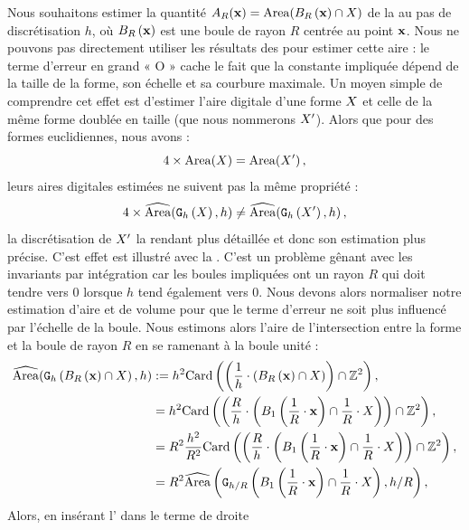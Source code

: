 Nous souhaitons estimer la quantité $A_R(\vx) = \Area(\Ball{R}{\vx}\cap\Shape)$ de la
 au pas de discrétisation $h$, où $\Ball{R}{\vx}$ est une
boule de rayon $R$ centrée au point $\vx$. Nous ne pouvons pas directement
utiliser les résultats des
 pour estimer cette
aire : le terme d'erreur en grand « O » cache le fait que la constante impliquée
dépend de la taille de la forme, son échelle et sa courbure maximale. Un moyen
simple de comprendre cet effet est d'estimer l'aire digitale d'une forme $\Shape$ et
celle de la même forme doublée en taille (que nous nommerons
$\Shape'$). Alors que pour des formes euclidiennes, nous avons :
%
\begin{equation}
  4 \times \Area(\Shape) = \Area(\Shape') \,,
\end{equation}
%
leurs aires digitales estimées ne suivent pas la même propriété :
%
\begin{equation}
  4 \times \AreaC(\DSh,h) \ne \AreaC(\DigF{\Shape'}{h},h) \,,
\end{equation}
%
la discrétisation de $\Shape'$ la rendant plus détaillée et donc son estimation
plus précise. C'est effet est illustré avec la . C'est
un problème gênant avec les invariants par intégration car les boules impliquées
ont un rayon $R$ qui doit tendre vers $0$ lorsque $h$ tend également vers $0$.
Nous devons alors normaliser notre estimation d'aire et de volume pour que le
terme d'erreur ne soit plus influencé par l'échelle de la boule. Nous estimons
alors l'aire de l'intersection entre la forme et la boule de rayon $R$ en se
ramenant à la boule unité :
%
\begin{align}
  \AreaC(\DigF{\Ball{R}{\vx} \cap \Shape}{h}, h) & \EqDef h^2 \MCard\left( \left( \frac{1}{h} \cdot \left( \Ball{R}{\vx} \cap \Shape \right) \right) \cap \Z^2 \right), \\
   & = h^2 \MCard\left( \left(\frac{R}{h} \cdot \left( \Ball{1}{\frac{1}{R} \cdot \vx} \cap \frac{1}{R} \cdot \Shape\right) \right) \cap \Z^2 \right), \\
   & = R^2 \frac{h^2}{R^2} \MCard\left( \left(\frac{R}{h} \cdot \left( \Ball{1}{\frac{1}{R} \cdot \vx} \cap \frac{1}{R} \cdot \Shape\right) \right) \cap \Z^2 \right), \\
   & = R^2 \AreaC\left( \DigF{\Ball{1}{\frac{1}{R} \cdot \vx} \cap \frac{1}{R} \cdot \Shape}{h/R}, h/R \right), \label{eq:Area_unitary_ball}
\end{align}
%
Alors, en insérant l' dans le terme de droite
